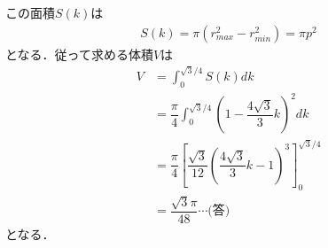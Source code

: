 \documentclass[../../main.tex]{subfiles}
\begin{document}
この面積$S(k)$は
\begin{align}
  S(k)=\pi(r_{max}^2- r_{min}^2) =\pi p^2
\end{align}
となる．従って求める体積$V$は
\begin{align}
  V
  &=\int_0^{\sqrt{3}/4}S(k)dk \\
  &=\dfrac{\pi}{4}\int_0^{\sqrt{3}/4}\left(1-\dfrac{4\sqrt{3}}{3}k\right)^2dk \\
  &=\dfrac{\pi}{4}\left[\dfrac{\sqrt{3}}{12}\left(\dfrac{4\sqrt{3}}{3}k-1\right)^3\right]_0^{\sqrt{3}/4} \\
  &=\dfrac{\sqrt{3}\pi}{48}\cdots\text{(答)}
\end{align}
となる．
\newpage
\end{document}

